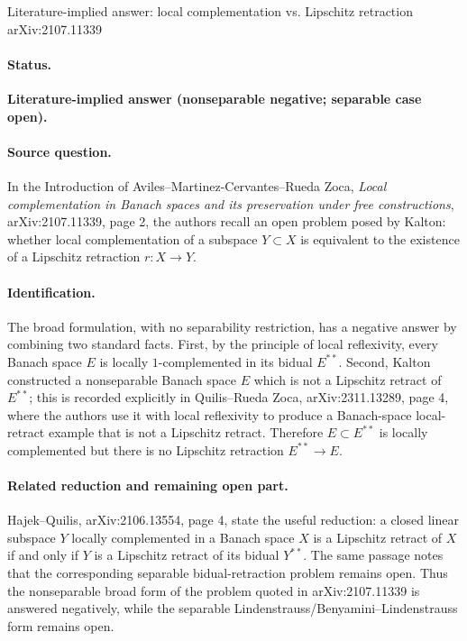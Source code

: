 \documentclass[11pt]{article}
\begin{document}
\begin{center}
{\Large Literature-implied answer: local complementation vs. Lipschitz retraction}\\[0.5em]
{\large arXiv:2107.11339}
\end{center}

\paragraph{Status.}
\textbf{Literature-implied answer (nonseparable negative; separable case
open).}

\paragraph{Source question.}
In the Introduction of Aviles--Martinez-Cervantes--Rueda Zoca,
\emph{Local complementation in Banach spaces and its preservation under free
constructions}, arXiv:2107.11339, page 2, the authors recall an open problem
posed by Kalton: whether local complementation of a subspace \(Y\subset X\) is
equivalent to the existence of a Lipschitz retraction \(r:X\to Y\).

\paragraph{Identification.}
The broad formulation, with no separability restriction, has a negative answer
by combining two standard facts.  First, by the principle of local reflexivity,
every Banach space \(E\) is locally \(1\)-complemented in its bidual
\(E^{**}\).  Second, Kalton constructed a nonseparable Banach space \(E\) which
is not a Lipschitz retract of \(E^{**}\); this is recorded explicitly in
Quilis--Rueda Zoca, arXiv:2311.13289, page 4, where the authors use it with
local reflexivity to produce a Banach-space local-retract example that is not a
Lipschitz retract.  Therefore \(E\subset E^{**}\) is locally complemented but
there is no Lipschitz retraction \(E^{**}\to E\).

\paragraph{Related reduction and remaining open part.}
Hajek--Quilis, arXiv:2106.13554, page 4, state the useful reduction: a closed
linear subspace \(Y\) locally complemented in a Banach space \(X\) is a
Lipschitz retract of \(X\) if and only if \(Y\) is a Lipschitz retract of its
bidual \(Y^{**}\).  The same passage notes that the corresponding separable
bidual-retraction problem remains open.  Thus the nonseparable broad form of
the problem quoted in arXiv:2107.11339 is answered negatively, while the
separable Lindenstrauss/Benyamini--Lindenstrauss form remains open.
\end{document}
